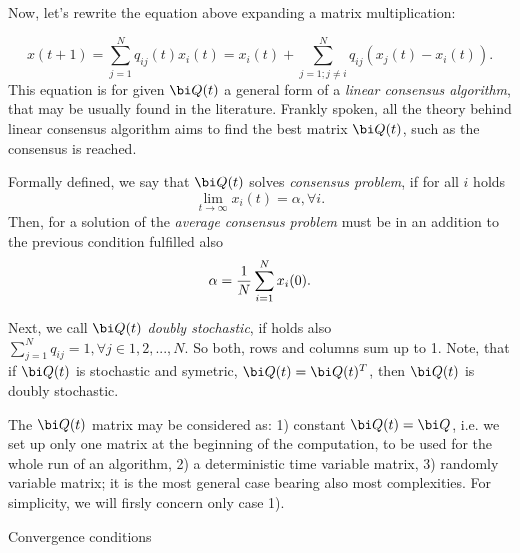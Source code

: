 Now, let's  rewrite the equation above expanding a matrix multiplication:

$$ x(t+1) = \sum_{j=1}^N q_{ij}(t) x_i (t) = x_i(t) + \sum_{j=1; j\not= i}^N q_{ij}(x_j(t)-x_i(t)).$$
This equation is for given ${\bi Q} (t)$ a general form of a {\em linear consensus algorithm}, that may be usually found in the literature. Frankly spoken, all the theory behind linear consensus algorithm aims to find the best matrix $  {\bi Q}(t)$, such as the consensus is reached. 

Formally defined, we say that $  {\bi Q}(t)$ solves {\em consensus problem}, if for all $i$ holds  $$\lim_{t\rightarrow\infty} x_i (t)= \alpha, \forall i.$$ Then, for a solution of the {\em average consensus problem} must be in an addition to the previous condition fulfilled also $$\alpha = {1\over N} \sum_{i=1}^Nx_i(0).$$


Next, we call   $  {\bi Q}(t)$ {\em doubly stochastic}, if holds also $\sum _{j=1}^N q_{ij} = 1, \forall j \in {1, 2, ..., N}.$ So both, rows and columns sum up to 1. Note, that  if $  {\bi Q} (t) $ is stochastic and symetric, $  {\bi Q}(t) = {\bi Q}(t) ^T$, then $  {\bi Q}(t)$ is doubly stochastic.

The ${\bi Q} (t)$ matrix may be considered as: 1) constant ${\bi Q} (t) = {\bi Q}$, i.e. we set up only one matrix at the beginning of the computation, to be used for the whole run of an algorithm, 2) a deterministic time variable matrix, 3) randomly variable matrix; it is the most general case bearing also most complexities. For simplicity, we will firsly concern only case 1). %





\sec Convergence conditions

